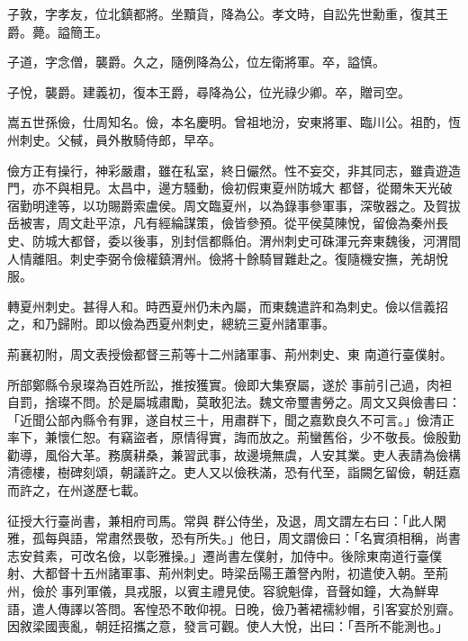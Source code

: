 \begin{pinyinscope}
 子敦，字孝友，位北鎮都將。坐黷貨，降為公。孝文時，自訟先世勳重，復其王爵。薨。謚簡王。



 子道，字念僧，襲爵。久之，隨例降為公，位左衛將軍。卒，謚慎。



 子悅，襲爵。建義初，復本王爵，尋降為公，位光祿少卿。卒，贈司空。



 嵩五世孫儉，仕周知名。儉，本名慶明。曾祖地汾，安東將軍、臨川公。祖酌，恆州刺史。父戫，員外散騎侍郎，早卒。



 儉方正有操行，神彩嚴肅，雖在私室，終日儼然。性不妄交，非其同志，雖貴遊造門，亦不與相見。太昌中，邊方騷動，儉初假東夏州防城大
 都督，從爾朱天光破宿勤明達等，以功賜爵索盧侯。周文臨夏州，以為錄事參軍事，深敬器之。及賀拔岳被害，周文赴平涼，凡有經綸謀策，儉皆參預。從平侯莫陳悅，留儉為秦州長史、防城大都督，委以後事，別封信都縣伯。渭州刺史可硃渾元奔東魏後，河渭間人情離阻。刺史李弼令儉權鎮渭州。儉將十餘騎冒難赴之。復隨機安撫，羌胡悅服。



 轉夏州刺史。甚得人和。時西夏州仍未內屬，而東魏遣許和為刺史。儉以信義招之，和乃歸附。即以儉為西夏州刺史，總統三夏州諸軍事。



 荊襄初附，周文表授儉都督三荊等十二州諸軍事、荊州刺史、東
 南道行臺僕射。



 所部鄭縣令泉璨為百姓所訟，推按獲實。儉即大集寮屬，遂於事前引己過，肉袒自罰，捨璨不問。於是屬城肅勵，莫敢犯法。魏文帝璽書勞之。周文又與儉書曰：「近聞公部內縣令有罪，遂自杖三十，用肅群下，聞之嘉歎良久不可言。」儉清正率下，兼懷仁恕。有竊盜者，原情得實，誨而放之。荊蠻舊俗，少不敬長。儉殷勤勸導，風俗大革。務廣耕桑，兼習武事，故邊境無虞，人安其業。吏人表請為儉構清德樓，樹碑刻頌，朝議許之。吏人又以儉秩滿，恐有代至，詣闕乞留儉，朝廷嘉而許之，在州遂歷七載。



 征授大行臺尚書，兼相府司馬。常與
 群公侍坐，及退，周文謂左右曰：「此人閑雅，孤每與語，常肅然畏敬，恐有所失。」他日，周文謂儉曰：「名實須相稱，尚書志安貧素，可改名儉，以彰雅操。」遷尚書左僕射，加侍中。後除東南道行臺僕射、大都督十五州諸軍事、荊州刺史。時梁岳陽王蕭詧內附，初遣使入朝。至荊州，儉於事列軍儀，具戎服，以賓主禮見使。容貌魁偉，音聲如鐘，大為鮮卑語，遣人傳譯以答問。客惶恐不敢仰視。日晚，儉乃著裙襦紗帽，引客宴於別齋。因敘梁國喪亂，朝廷招攜之意，發言可觀。使人大悅，出曰：「吾所不能測也。」




\end{pinyinscope}

